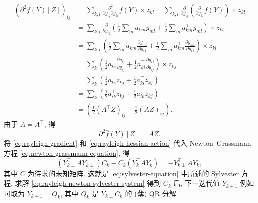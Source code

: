 \[\begin{aligned}
(\partial^2f(Y)[Z])_{ij}&=\sum_{k,l}\frac{\partial^2}{\partial y_{ij}\partial y_{kl}}f(Y)\times z_{kl}
=\sum_{k,l}\frac{\partial}{\partial y_{ij}}\left(\frac{\partial}{\partial y_{kl}}f(Y)\right)\times z_{kl}\\
&=\sum_{k,l}\frac{\partial}{\partial y_{ij}}\left(\frac12\sum_ma_{km}y_{ml}+\frac12\sum_ma_{km}^{\top}y_{ml}\right)\times z_{kl}\\
&=\sum_{k,l}\left(\frac12\sum_ma_{km}\frac{\partial y_{ml}}{\partial y_{ij}}+\frac12\sum_ma_{km}^{\top}\frac{\partial y_{ml}}{\partial y_{ij}}\right)\times z_{kl}\\
&=\sum_k\left(\frac12a_{ki}\frac{\partial y_{ij}}{\partial y_{ij}}+\frac12a_{ki}^{\top}\frac{\partial y_{ij}}{\partial y_{ij}}\right)\times z_{kj}\\
&=\sum_k\left(\frac12a_{ki}z_{kj}+\frac12a_{ki}^{\top}z_{kj}\right)\\
&=\sum_k\left(\frac12a_{ik}^{\top}z_{kj}+\frac12a_{ik}z_{kj}\right)\\
&=\left(\frac12(A^{\top}Z)_{ij}+\frac12(AZ)_{ij}\right).
\end{aligned}\]
{由于 $A=A^{\top}$, 得}
\begin{equation}\label{eq:rayleigh-hessian-action}
\partial^2\bar f(Y)[Z]=AZ.
\end{equation}
{将 \eqref{eq:rayleigh-gradient} 和 \eqref{eq:rayleigh-hessian-action} 代入 Newton--Grassmann 方程 \eqref{eq:newton-grassmann-equation}, 得}
\begin{equation}\label{eq:rayleigh-newton-sylvester-system}
(Y_{k\perp}^{\top}AY_{k\perp})C_k-C_k(Y_k^{\top}AY_k)=-Y_{k\perp}^{\top}AY_k,
\end{equation}
{其中 $C$ 为待求的未知矩阵. 这就是 \eqref{eq:sylvester-equation} 中所述的 Sylvester 方程. 求解 \eqref{eq:rayleigh-newton-sylvester-system} 得到 $C_k$ 后, 下一迭代值 $Y_{k+1}$ 例如可取为 $Y_{k+1}=Q_k$, 其中 $Q_k$ 是 $Y_{k\perp}C_k$ 的 (薄) QR 分解.}

